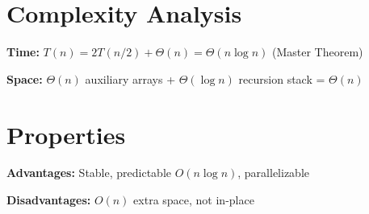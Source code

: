 \documentclass{article}
\begin{document}
\section{Complexity Analysis}

\textbf{Time:} $T(n) = 2T(n/2) + \Theta(n) = \Theta(n \log n)$ (Master Theorem)

\textbf{Space:} $\Theta(n)$ auxiliary arrays + $\Theta(\log n)$ recursion stack = $\Theta(n)$

\section{Properties}

\textbf{Advantages:} Stable, predictable $O(n \log n)$, parallelizable

\textbf{Disadvantages:} $O(n)$ extra space, not in-place
\end{document}
